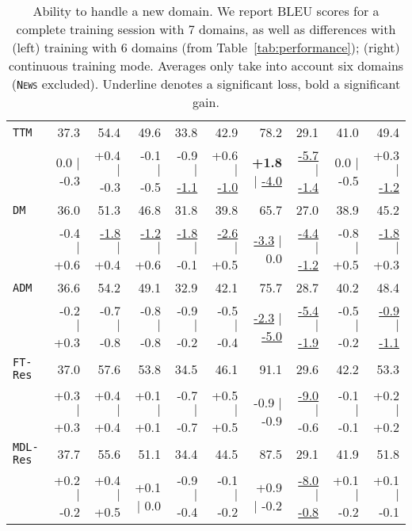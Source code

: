 \documentclass[12pt,a4paper,twoside]{report}
\theoremstyle{definition}
\newcommand{\domain}[1]{\texttt{\textsc{#1}}}
\newcommand{\system}[1]{\texttt{{#1}}}
\newcommand{\SB}[1]{\textbf{#1}}
\newcommand{\SW}[1]{\underline{#1}}
\newcommand{\sbcl}[2]{{\scriptsize #1 \hfill $|$ \hfill  #2}}
\begin{document}
\begin{table*}[h!]
\begin{tabular}{|p{1.6cm}|*{9}{r|}}
    \footnotesize \system{TTM}           &  37.3 & 54.4   & 49.6    & 33.8  &  42.9  &78.2  & 29.1 & 41.0 & 49.4\\[-2pt]

                    & \sbcl{0.0}{-0.3}  & \sbcl{+0.4}{-0.3}  & \sbcl{-0.1}{-0.5}  & \sbcl{-0.9}{\SW{-1.1}}  & \sbcl{+0.6}{\SW{-1.0}}  & \sbcl{\SB{+1.8}}{\SW{-4.0}} & \sbcl{\SW{-5.7}}{\SW{-1.4}} & \sbcl{0.0}{-0.5} & \sbcl{+0.3}{\SW{-1.2}}\\
    
    \footnotesize \system{DM}            &36.0 &51.3&46.8&31.8&39.8&65.7&27.0 & 38.9 & 45.2\\[-2pt]
                   & \sbcl{-0.4}{+0.6} & \sbcl{\SW{-1.8}}{+0.4} & \sbcl{\SW{-1.2}}{+0.6} & \sbcl{\SW{-1.8}}{-0.1} & \sbcl{\SW{-2.6}}{+0.5} & \sbcl{\SW{-3.3}}{0.0} & \sbcl{\SW{-4.4}}{\SW{-1.2}} & \sbcl{-0.8}{+0.5} & \sbcl{\SW{-1.8}}{+0.3}\\    
    
    \footnotesize \system{ADM}          &36.6&54.2&49.1&32.9&42.1&75.7&28.7 & 40.2 & 48.4 \\[-2pt]
                   & \sbcl{-0.2}{+0.3} & \sbcl{-0.7}{-0.8} & \sbcl{-0.8}{-0.8} & \sbcl{-0.9}{-0.2} & \sbcl{-0.5}{-0.4} & \sbcl{\SW{-2.3}}{\SW{-5.0}} & \sbcl{\SW{-5.4}}{\SW{-1.9}} & \sbcl{-0.5}{-0.2} & \sbcl{\SW{-0.9}}{\SW{-1.1}}\\
    
    \footnotesize \system{FT-Res}  & 37.0 & 57.6 & 53.8 & 34.5 &	46.1 & 91.1 & 29.6 &	42.2  & 53.3 \\[-2pt]
                               & \sbcl{+0.3}{+0.3} & \sbcl{+0.4}{+0.4} & \sbcl{+0.1}{+0.1} & \sbcl{-0.7}{-0.7} & \sbcl{+0.5}{+0.5} & \sbcl{-0.9}{-0.9} & \sbcl{\SW{-9.0}}{-0.6} & \sbcl{-0.1}{-0.1} & \sbcl{+0.2}{+0.2} \\
    
    \footnotesize \system{MDL-Res}    &37.7   & 55.6   & 51.1   & 34.4  & 44.5  & 87.5  & 29.1 & 41.9 & 51.8 \\[-2pt]
                        &  \sbcl{+0.2}{-0.2} & \sbcl{+0.4}{+0.5} & \sbcl{+0.1}{0.0} & \sbcl{-0.9}{-0.4}  & \sbcl{-0.1}{-0.2} &  \sbcl{+0.9}{-0.2} & \sbcl{\SW{-8.0}}{\SW{-0.8}} & \sbcl{+0.1}{-0.2} & \sbcl{+0.1}{-0.1} \\
     \hline
  \end{tabular}
  \caption{Ability to handle a new domain. We report BLEU scores for a complete training session with 7 domains, as well as differences with (left) training with 6 domains (from Table~\ref{tab:performance}); (right) continuous training mode. Averages only take into account six domains (\domain{News} excluded). Underline denotes a significant loss, bold a significant gain.}
  \label{tab:warmrestart}
\end{table*}
\end{document}
